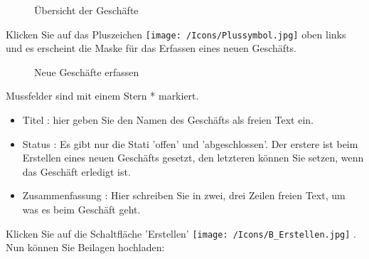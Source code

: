 
\begin{figure}[H]
\caption{Übersicht der Geschäfte}
\end{figure}

Klicken Sie auf das Pluszeichen \texttt{[image: /Icons/Plussymbol.jpg]}  oben links und es erscheint die Maske für das Erfassen eines neuen Geschäfts.

\begin{figure}[H]
\caption{Neue Geschäfte erfassen}
\end{figure}

Mussfelder sind mit einem Stern * markiert.

\begin{itemize}
\item
Titel : hier geben Sie den Namen des Geschäfts als freien Text ein.
\item 
Status : Es gibt nur die Stati 'offen' und 'abgeschlossen'. Der erstere ist beim Erstellen eines neuen Geschäfts gesetzt, den letzteren können Sie setzen, wenn das Geschäft erledigt ist.
\item
Zusammenfassung : Hier schreiben Sie in zwei, drei Zeilen freien Text, um was es beim Geschäft geht.
\end{itemize}

Klicken Sie auf die Schaltfläche 'Erstellen' \texttt{[image: /Icons/B\_Erstellen.jpg]} . Nun können Sie Beilagen hochladen:

